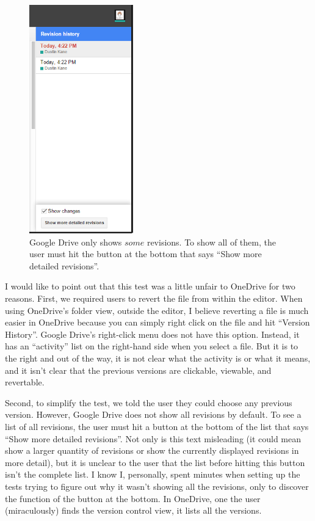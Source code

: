 \documentclass[a4paper,12pt]{article}
\begin{document}
\begin{figure}
\centering
\includegraphics[width=0.4\textwidth]{showdetail}
\caption{Google Drive only shows $some$ revisions. To show all of them, the user must hit the button at the bottom that says ``Show more detailed revisions''.}
\end{figure}

I would like to point out that this test was a little unfair to OneDrive for two reasons. First, we required users to revert the file from within the editor. When using OneDrive's folder view, outside the editor, I believe reverting a file is much easier in OneDrive because you can simply right click on the file and hit ``Version History''. Google Drive's right-click menu does not have this option. Instead, it has an ``activity'' list on the right-hand side when you select a file. But it is to the right and out of the way, it is not clear what the activity is or what it means, and it isn't clear that the previous versions are clickable, viewable, and revertable.

Second, to simplify the test, we told the user they could choose any previous version. However, Google Drive does not show all revisions by default. To see a list of all revisions, the user must hit a button at the bottom of the list that says ``Show more detailed revisions''. Not only is this text misleading (it could mean show a larger quantity of revisions or show the currently displayed revisions in more detail), but it is unclear to the user that the list before hitting this button isn't the complete list. I know I, personally, spent minutes when setting up the tests trying to figure out why it wasn't showing all the revisions, only to discover the function of the button at the bottom. In OneDrive, one the user (miraculously) finds the version control view, it lists all the versions.
\end{document}
